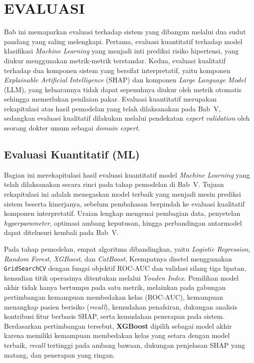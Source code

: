 \cleardoublepage
\chapter{EVALUASI}
\label{chap:evaluasi}
Bab ini memaparkan evaluasi terhadap sistem yang dibangun melalui dua sudut
pandang yang saling melengkapi. Pertama, evaluasi kuantitatif terhadap model
klasifikasi \emph{Machine Learning} yang menjadi inti prediksi risiko hipertensi,
yang diukur menggunakan metrik-metrik terstandar. Kedua, evaluasi kualitatif
terhadap dua komponen sistem yang bersifat interpretatif, yaitu komponen
\emph{Explainable Artificial Intelligence} (SHAP) dan komponen \emph{Large Language
Model} (LLM), yang keluarannya tidak dapat sepenuhnya diukur oleh metrik otomatis
sehingga memerlukan penilaian pakar. Evaluasi kuantitatif merupakan rekapitulasi
atas hasil pemodelan yang telah dilaksanakan pada Bab~V, sedangkan evaluasi
kualitatif dilakukan melalui pendekatan \emph{expert validation} oleh seorang
dokter umum sebagai \emph{domain expert}.

\section{Evaluasi Kuantitatif (ML)}
\label{sec:evaluasi-kuantitatif}
Bagian ini merekapitulasi hasil evaluasi kuantitatif model \emph{Machine Learning}
yang telah dilaksanakan secara rinci pada tahap pemodelan di Bab~V. Tujuan
rekapitulasi ini adalah menegaskan model terbaik yang menjadi mesin prediksi
sistem beserta kinerjanya, sebelum pembahasan berpindah ke evaluasi kualitatif
komponen interpretatif. Uraian lengkap mengenai pembagian data, penyetelan
\emph{hyperparameter}, optimasi ambang keputusan, hingga perbandingan antarmodel
dapat ditelusuri kembali pada Bab~V.

Pada tahap pemodelan, empat algoritma dibandingkan, yaitu \emph{Logistic
Regression}, \emph{Random Forest}, \emph{XGBoost}, dan \emph{CatBoost}. Keempatnya
disetel menggunakan \texttt{GridSearchCV} dengan fungsi objektif ROC-AUC dan
validasi silang tiga lipatan, kemudian titik operasinya ditentukan melalui
\emph{Youden Index}. Pemilihan model akhir tidak hanya bertumpu pada satu metrik,
melainkan pada gabungan pertimbangan kemampuan membedakan kelas (ROC-AUC),
kemampuan menangkap pasien berisiko (\emph{recall}), kemudahan penafsiran,
dukungan analisis kontribusi fitur berbasis SHAP, serta kemudahan penerapan pada
sistem. Berdasarkan pertimbangan tersebut, \textbf{XGBoost} dipilih sebagai model
akhir karena memiliki kemampuan membedakan kelas yang setara dengan model terbaik,
\emph{recall} tertinggi pada ambang bawaan, dukungan penjelasan SHAP yang matang,
dan penerapan yang ringan.

